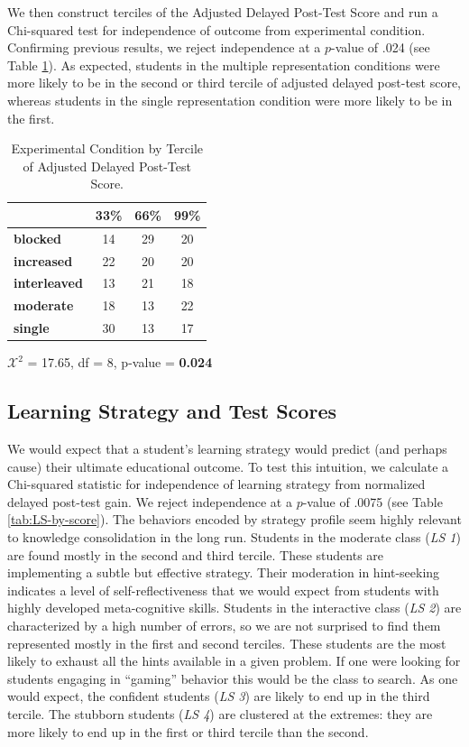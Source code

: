 \documentclass{edm_template}
\begin{document}
We then construct terciles of the Adjusted Delayed Post-Test Score and run a Chi-squared test for independence of outcome from experimental condition. Confirming previous results, we reject independence at a $p$-value of .024 (see Table \ref{tab:exp-and-score}). As expected, students in the multiple representation conditions were more likely to be in the second or third tercile of adjusted delayed post-test score, whereas students in the single representation condition were more likely to be in the first.

\begin{table}[hbtp]

\centering
\begin{tabular}{|l || c | c | c |}
\hline
&33\%&66\%&99\%\\ \hline \hline
  \textbf{blocked}  &   14& 29& 20 \\ \hline
  \textbf{increased}&   22& 20& 20 \\ \hline
\textbf{interleaved}& 13& 21& 18 \\ \hline
  \textbf{moderate} &   18& 13& 22 \\ \hline
    \textbf{single} &      30& 13& 17 \\ \hline
 \end{tabular}
  \begin{center} $\mathcal{X}^2$ = 17.65, df = 8, p-value = {\bf 0.024} \end{center}
 \caption{Experimental Condition by Tercile of Adjusted Delayed Post-Test Score.}
\label{tab:exp-and-score}
\end{table}


\subsection{Learning Strategy and Test Scores}

We would expect that a student's learning strategy would predict (and perhaps cause) their ultimate educational outcome. To test this intuition, we calculate a Chi-squared statistic for independence of learning strategy from normalized delayed post-test gain. We reject independence at a $p$-value of .0075 (see Table \ref{tab:LS-by-score}). The behaviors encoded by strategy profile seem highly relevant to knowledge consolidation in the long run. Students in the moderate class (\emph{LS 1}) are found mostly in the second and third tercile. These students are implementing a subtle but effective strategy. Their moderation in hint-seeking indicates a level of self-reflectiveness that we would expect from students with highly developed meta-cognitive skills. Students in the interactive class (\emph{LS 2}) are characterized by a high number of errors, so we are not surprised to find them represented mostly in the first and second terciles. These students are the most likely to exhaust all the hints available in a given problem. If one were looking for students engaging in ``gaming'' behavior this would be the class to search. As one would expect, the confident  students (\emph{LS 3}) are likely to end up in the third tercile. The stubborn students (\emph{LS 4}) are clustered at the extremes: they are more likely to end up in the first or third tercile than the second. 
\end{document}
